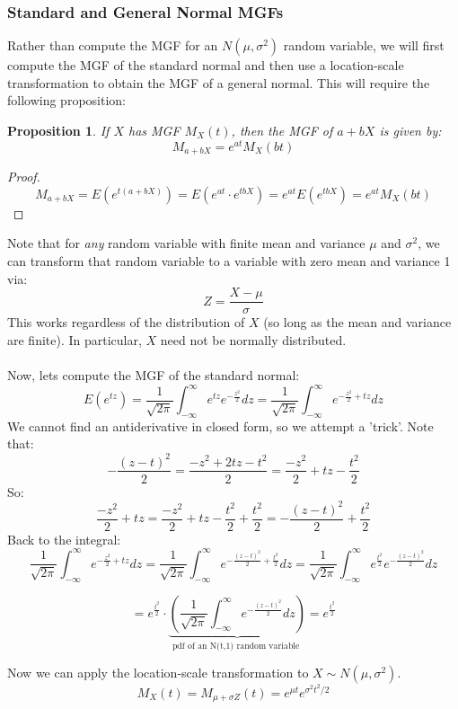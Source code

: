 \documentclass[12pt]{article} %
\newtheorem{prop}{Proposition}
\begin{document}
\subsubsection*{Standard and General Normal MGFs}
Rather than compute the MGF for an $N(\mu,\sigma^2)$ random variable, we will first compute the MGF of the standard normal and then use a location-scale transformation to obtain the MGF of a general normal. This will require the following proposition:
\begin{prop}
If $X$ has MGF $M_X(t)$, then the MGF of $a+bX$ is given by:
$$M_{a+bX} = e^{at}M_X(bt)$$
\end{prop}
\begin{proof}
$$M_{a+bX} = E\left(e^{t(a+bX)}\right) = E\left(e^{at}\cdot e^{tbX}\right) = e^{at} E\left(e^{tbX}\right) = e^{at} M_X(bt)$$  
\end{proof}
Note that for \emph{any} random variable with finite mean and variance $\mu$ and $\sigma^2$, we can transform that random variable to a variable with zero mean and variance 1 via:
$$Z=\frac{X-\mu}{\sigma}$$
This works regardless of the distribution of $X$ (so long as the mean and variance are finite). In particular, $X$ need not be normally distributed.\\\\
Now, lets compute the MGF of the standard normal:
$$E(e^{tz}) = \frac1{\sqrt{2\pi}}\int_{-\infty}^\infty e^{tz} e^{-\frac{z^2}{2}} dz = \frac1{\sqrt{2\pi}}\int_{-\infty}^\infty e^{-\frac{z^2}{2}+tz} dz$$ 
We cannot find an antiderivative in closed form, so we attempt a 'trick'. Note that:
$$-\frac{(z-t)^2}{2} = \frac{-z^2+2tz -t^2}{2} = \frac{-z^2}{2} + tz - \frac{t^2}2$$
So:
$$\frac{-z^2}{2} + tz = \frac{-z^2}{2} + tz -\frac{t^2}{2} +\frac{t^2}{2} = -\frac{(z-t)^2}{2} +\frac{t^2}{2}$$
Back to the integral:
$$\frac1{\sqrt{2\pi}}\int_{-\infty}^\infty e^{-\frac{z^2}{2}+tz} dz = \frac1{\sqrt{2\pi}}\int_{-\infty}^\infty e^{-\frac{(z-t)^2}{2}+\frac{t^2}{2}} dz = \frac1{\sqrt{2\pi}}\int_{-\infty}^\infty e^{\frac{t^2}{2}} e^{-\frac{(z-t)^2}{2}} dz$$

$$= e^{\frac{t^2}{2}}\cdot\underbrace{\left(\frac1{\sqrt{2\pi}}\int_{-\infty}^\infty  e^{-\frac{(z-t)^2}{2}} dz\right)}_{\text{pdf of an N(t,1) random variable }} = e^{\frac{t^2}{2}}$$ 

Now we can apply the location-scale transformation to $X\sim N(\mu,\sigma^2)$.
$$M_X(t) = M_{\mu + \sigma Z}(t) = e^{\mu t} e^{\sigma^2 t^2/2}$$
\end{document}

